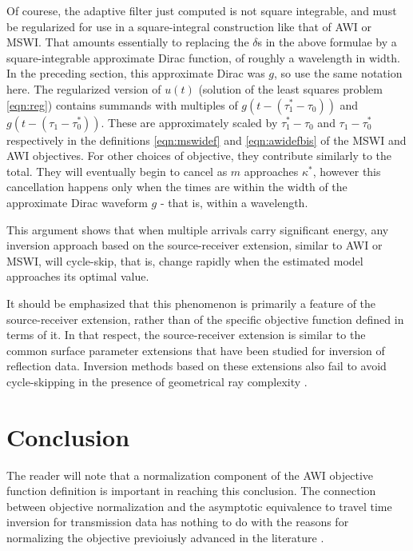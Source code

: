 Of courese, the adaptive filter just computed is not square
integrable, and must be regularized for use in a square-integral
construction like that of AWI or MSWI. That amounts essentially to
replacing the $\delta$s in the above formulae by a square-integrable
approximate Dirac function, of roughly a wavelength in width. In the
preceding section, this approximate Dirac was $g$, so use the same
notation here. The regularized version of $u(t)$ (solution of the
least squares problem \ref{eqn:reg}) contains summands with multiples of $g(t-(\tau^*_1-\tau_0))$
and $g(t-(\tau_1-\tau^*_0))$. These are approximately scaled by
$\tau^*_1-\tau_0$ and $\tau_1-\tau^*_0$ respectively in the
definitions \ref{eqn:mswidef} and \ref{eqn:awidefbis} of the MSWI and AWI
objectives. For other choices of objective, they contribute similarly
to the total. They will eventually begin to cancel as $m$ approaches
$\kappa^*$, however this cancellation happens only when the times are
within the width of the approximate 
Dirac waveform $g$ - that is, within a wavelength.

This argument shows that when multiple arrivals carry significant energy, any
inversion approach based on the source-receiver extension, similar to
AWI or MSWI, will cycle-skip, that is, change rapidly when the
estimated model approaches its optimal value.

It should be emphasized that this phenomenon is primarily a feature of the
source-receiver extension, rather than of the specific objective
function defined in terms of it. In that respect, the source-receiver
extension is similar to the common surface parameter extensions that
have been studied for inversion of reflection data. Inversion methods
based on these extensions also fail to avoid cycle-skipping in the presence of
geometrical ray complexity \cite[]{geoprosp:2008}.

\section{Conclusion}

The reader will
note that a normalization component of the AWI objective function
definition is important in reaching this conclusion. The connection
between objective normalization and the asymptotic equivalence to
travel time inversion for transmission data has nothing to do with the
reasons for normalizing the objective previoiusly advanced in the
literature \cite[]{Warner:16,LiAlkhalifah:21}.


